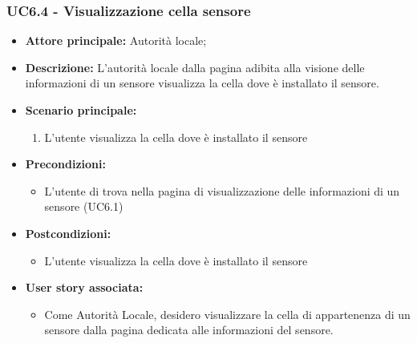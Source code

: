 \subsubsection{UC6.4 - Visualizzazione cella sensore}
\begin{itemize}
    \item \textbf{Attore principale:} Autorità locale;
    \item \textbf{Descrizione:} L’autorità locale dalla pagina adibita alla visione delle informazioni di un sensore visualizza la cella dove è installato il sensore.
    \item \textbf{Scenario principale:}
          \begin{enumerate}
              \item L'utente visualizza la cella dove è installato il sensore
          \end{enumerate}
    \item \textbf{Precondizioni:}
          \begin{itemize}
              \item  L'utente di trova nella pagina di visualizzazione delle informazioni di un sensore (UC6.1)
          \end{itemize}
    \item \textbf{Postcondizioni:}
          \begin{itemize}
              \item  L'utente visualizza la cella dove è installato il sensore
          \end{itemize}
    \item \textbf{User story associata:}
          \begin{itemize}
              \item Come Autorità Locale, desidero visualizzare la cella di appartenenza di un sensore dalla pagina dedicata alle informazioni del sensore.
          \end{itemize}
\end{itemize}